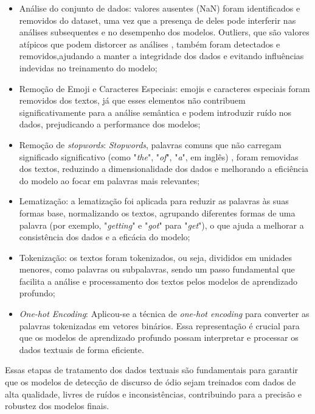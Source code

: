 \documentclass[conference]{IEEEtran}
\begin{document}
\begin{itemize}
    \item Análise do conjunto de dados: valores ausentes (NaN) foram identificados e removidos do dataset, uma vez que a presença de deles pode interferir nas análises subsequentes e no desempenho dos modelos. Outliers, que são valores atípicos que podem distorcer as análises \cite{outliers}, também foram detectados e removidos,ajudando a manter a integridade dos dados e evitando influências indevidas no treinamento do modelo;
    
    \item Remoção de Emoji e Caracteres Especiais: emojis e caracteres especiais foram removidos dos textos, já que esses elementos não contribuem significativamente para a análise semântica e podem introduzir ruído nos dados, prejudicando a performance dos modelos;

    \item Remoção de \textit{stopwords}: \textit{Stopwords}, palavras comuns que não carregam significado significativo (como "\textit{the}", "\textit{of}", "\textit{a}", em inglês) \cite{stop}, foram removidas dos textos, reduzindo a dimensionalidade dos dados e melhorando a eficiência do modelo ao focar em palavras mais relevantes;

    \item Lematização: a lematização foi aplicada para reduzir as palavras às suas formas base, normalizando os textos, agrupando diferentes formas de uma palavra (por exemplo, "\textit{getting}" e "\textit{got}" para "\textit{get}"), o que ajuda a melhorar a consistência dos dados e a eficácia do modelo;

    \item Tokenização: os textos foram tokenizados, ou seja, divididos em unidades menores, como palavras ou subpalavras, sendo um passo fundamental que facilita a análise e processamento dos textos pelos modelos de aprendizado profundo;

    \item \textit{One-hot Encoding}: Aplicou-se a técnica de \textit{one-hot encoding} para converter as palavras tokenizadas em vetores binários. Essa representação é crucial para que os modelos de aprendizado profundo possam interpretar e processar os dados textuais de forma eficiente.
\end{itemize}
Essas etapas de tratamento dos dados textuais são fundamentais para garantir que os modelos de detecção de discurso de ódio sejam treinados com dados de alta qualidade, livres de ruídos e inconsistências, contribuindo para a precisão e robustez dos modelos finais.
\end{document}
